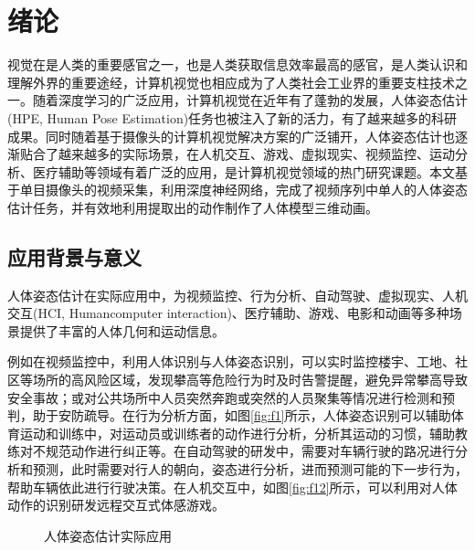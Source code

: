 
\chapter{绪论}

视觉在是人类的重要感官之一，也是人类获取信息效率最高的感官，是人类认识和理解外界的重要途经，计算机视觉也相应成为了人类社会工业界的重要支柱技术之一。随着深度学习的广泛应用，计算机视觉在近年有了蓬勃的发展，人体姿态估计(HPE, Human Pose Estimation)任务也被注入了新的活力，有了越来越多的科研成果。同时随着基于摄像头的计算机视觉解决方案的广泛铺开，人体姿态估计也逐渐贴合了越来越多的实际场景，在人机交互、游戏、虚拟现实、视频监控、运动分析、医疗辅助等领域有着广泛的应用，是计算机视觉领域的热门研究课题。本文基于单目摄像头的视频采集，利用深度神经网络，完成了视频序列中单人的人体姿态估计任务，并有效地利用提取出的动作制作了人体模型三维动画。



\section{应用背景与意义}


人体姿态估计在实际应用中，为视频监控、行为分析、自动驾驶、虚拟现实、人机交互(HCI, Humancomputer interaction)、医疗辅助、游戏、电影和动画等多种场景提供了丰富的人体几何和运动信息。

例如在视频监控中，利用人体识别与人体姿态识别，可以实时监控楼宇、工地、社区等场所的高风险区域，发现攀高等危险行为时及时告警提醒，避免异常攀高导致安全事故；或对公共场所中人员突然奔跑或突然的人员聚集等情况进行检测和预判，助于安防疏导。在行为分析方面，如图\ref{fig:f1}所示，人体姿态识别可以辅助体育运动和训练中，对运动员或训练者的动作进行分析，分析其运动的习惯，辅助教练对不规范动作进行纠正等。在自动驾驶的研发中，需要对车辆行驶的路况进行分析和预测，此时需要对行人的朝向，姿态进行分析，进而预测可能的下一步行为，帮助车辆依此进行行驶决策。在人机交互中，如图\ref{fig:f12}所示，可以利用对人体动作的识别研发远程交互式体感游戏。

\begin{figure}[h!]
  \centering
  \caption{人体姿态估计实际应用}
\end{figure}

